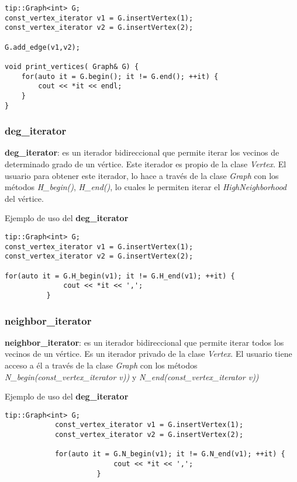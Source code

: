 \documentclass[a4paper,12pt]{article}
\begin{document}
\begin{lstlisting}[frame=single]
tip::Graph<int> G;
const_vertex_iterator v1 = G.insertVertex(1);
const_vertex_iterator v2 = G.insertVertex(2);

G.add_edge(v1,v2);

void print_vertices( Graph& G) {
    for(auto it = G.begin(); it != G.end(); ++it) {
        cout << *it << endl;
    }
}
\end{lstlisting}

\subsubsection{deg\_iterator}
\label{sec:deg_iterator}

\textbf{deg\_iterator}: es un iterador bidireccional que permite iterar los vecinos de determinado grado de un vértice. Este iterador es propio de la clase \textit{Vertex}. El usuario para obtener este iterador, lo hace a través de la clase \textit{Graph} con los métodos 
\textit{H\_begin()}, \textit{H\_end()}, lo cuales le permiten iterar el \textit{HighNeighborhood} del vértice.

Ejemplo de uso del \textbf{deg\_iterator}

\begin{lstlisting}[frame=single]
tip::Graph<int> G;
const_vertex_iterator v1 = G.insertVertex(1);
const_vertex_iterator v2 = G.insertVertex(2);

for(auto it = G.H_begin(v1); it != G.H_end(v1); ++it) {
              cout << *it << ',';
          }
\end{lstlisting}

\subsubsection{neighbor\_iterator}
\label{sec:neighbor iterator}
\textbf{neighbor\_iterator}: es un iterador bidireccional que permite iterar todos los vecinos de un vértice. Es un iterador privado de la clase \textit{Vertex}. El usuario tiene acceso a él a través de la clase \textit{Graph} con los métodos \textit{N\_begin(const\_vertex\_iterator v))} y \textit{N\_end(const\_vertex\_iterator v))}

                        Ejemplo de uso del \textbf{deg\_iterator}
\textit{}
            \begin{lstlisting}[frame=single]
            tip::Graph<int> G;
            const_vertex_iterator v1 = G.insertVertex(1);
            const_vertex_iterator v2 = G.insertVertex(2);

            for(auto it = G.N_begin(v1); it != G.N_end(v1); ++it) {
                          cout << *it << ',';
                      }
            \end{lstlisting}
\end{document}
